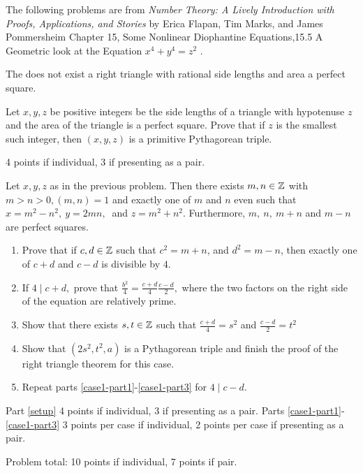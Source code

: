 \documentclass[letterpaper, 11 pt, instructornotes]{ximera}
\begin{document}
\begin{exploration}
The following problems are from \emph{Number Theory: A Lively Introduction with Proofs, Applications, and Stories} by Erica Flapan, Tim Marks, and James Pommersheim Chapter 15, Some Nonlinear Diophantine Equations,15.5 A Geometric look at the Equation $x^4 + y^4 = z^2$ \cite{theo}.

\begin{theorem}
The does not exist a right triangle with rational side lengths and area a perfect square.
\end{theorem}

\begin{problem}
 	Let $x,y,z$ be positive integers be the side lengths of a triangle with hypotenuse $z$ and the area of the triangle is a perfect square.  Prove that if $z$ is the smallest such integer, then $(x,y,z)$ is a primitive Pythagorean triple.
	
\begin{rubric}
 4 points if individual, 3 if presenting as a pair.
\end{rubric}
\end{problem}

\begin{problem}
	Let $x,y,z$ as in the previous problem. Then there exists $m, n\in\mathbb Z$ with $m>n>0, (m,n)=1$ and exactly one of $m$ and $n$ even such that $x=m^2-n^2,\ y=2mn,\ $ and $z=m^2+n^2$. Furthermore, $m,\ n,\ m+n$ and $m-n$ are perfect squares. 
	
	\begin{enumerate}
		\item\label{setup}  Prove that if $c,d\in\mathbb Z$ such that $c^2=m+n$, and $d^2=m-n$, then exactly one of $c+d$ and $c-d$ is divisible by $4$.
		
		\item\label{case1-part1} If $4\mid c+d,$ prove that $\frac{b^2}{4}=\frac{c+d}{4}\frac{c-d}{2},$ where the two factors on the right side of the equation are relatively prime. 
		
		\item Show that there exists $s,t\in\mathbb Z$ such that $\frac{c+d}{4}=s^2$ and $\frac{c-d}{2}=t^2$ 
		
		\item\label{case1-part3} Show that $(2s^2,t^2,a)$ is a Pythagorean triple and finish the proof of the right triangle theorem for this case. 
		
		\item Repeat parts \ref{case1-part1}-\ref{case1-part3} for $4\mid c-d.$ 
	\end{enumerate}
\begin{rubric}
 Part \ref{setup} 4 points if individual, 3 if presenting as a pair.  Parts \ref{case1-part1}-\ref{case1-part3} 3 points per case if individual, 2 points per case if presenting as a pair.
 
 Problem total: 10 points if individual, 7 points if pair.
\end{rubric}
\end{problem}
\end{exploration}
\end{document}

